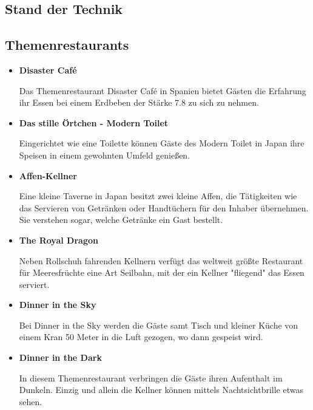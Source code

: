   \subsection{Stand der Technik}
  \subsection*{Themenrestaurants}

  \begin{itemize}
    \item \textbf{Disaster Café}

    Das Themenrestaurant {Disaster Café\cite{disastercafe}} in Spanien bietet Gästen die Erfahrung ihr Essen bei einem Erdbeben
    der Stärke 7.8 zu sich zu nehmen.

    \item \textbf{Das stille Örtchen - Modern Toilet}

    Eingerichtet wie eine Toilette können Gäste des {Modern Toilet\cite{moderntoilet}} in Japan ihre Speisen in einem gewohnten Umfeld genießen.

    \item \textbf{Affen-Kellner}

    {Eine kleine Taverne in Japan\cite{affenkellner}} besitzt zwei kleine Affen, die Tätigkeiten wie das Servieren von Getränken oder Handtüchern
    für den Inhaber übernehmen. Sie verstehen sogar, welche Getränke ein Gast bestellt.

    \item \textbf{{The Royal Dragon\cite{royaldragon}}}

    Neben Rollschuh fahrenden Kellnern verfügt das weltweit größte Restaurant für Meeresfrüchte eine
    Art Seilbahn, mit der ein Kellner "fliegend" das Essen serviert.

    \item \textbf{Dinner in the Sky}

    Bei {Dinner in the Sky\cite{dinnerinthesky}} werden die Gäste samt Tisch und kleiner Küche von einem Kran 50 Meter
    in die Luft gezogen, wo dann gespeist wird.

    \item \textbf{{Dinner in the Dark\cite{dinnerinthedark}}}

    In diesem Themenrestaurant verbringen die Gäste ihren Aufenthalt im Dunkeln. Einzig und allein die
    Kellner können mittels Nachtsichtbrille etwas sehen.

  \end{itemize}

